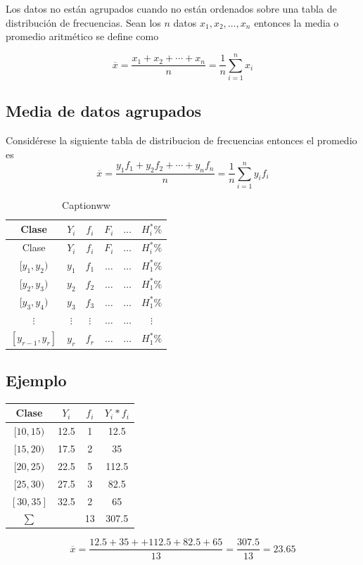 \documentclass[10pt,]{krantz}
\theoremstyle{definition}
\theoremstyle{definition}
\theoremstyle{definition}
\theoremstyle{definition}
\theoremstyle{remark}
\begin{document}
Los datos no están agrupados cuando no están ordenados sobre una tabla de distribución de frecuencias. Sean los \(n\) datos \(x_1, x_2, \ldots, x_n\) entonces la media o promedio aritmético se define como

\[ 
\overline{x}=\frac{x_1+x_2+\cdots+x_n}{n}=\frac{1}{n}\sum_{i=1}^nx_i 
\]

\hypertarget{media-de-datos-agrupados}{%
\subsection{Media de datos agrupados}\label{media-de-datos-agrupados}}

Considérese la siguiente tabla de distribucion de frecuencias entonces el promedio es \[\overline{x}=\frac{y_1f_1+y_2f_2+\cdots+y_nf_n}{n}=\frac{1}{n}\sum_{i=1}^ny_if_i\]

\begin{longtable}[]{@{}cccccc@{}}
\caption{\label{tab:www} Captionww}\tabularnewline
\toprule
Clase & \(Y_i\) & \(f_i\) & \(F_i\) & \(\ldots\) & \(H_i^*\%\)\tabularnewline
\midrule
\endfirsthead
\toprule
Clase & \(Y_i\) & \(f_i\) & \(F_i\) & \(\ldots\) & \(H_i^*\%\)\tabularnewline
\midrule
\endhead
\([y_1,y_2)\) & \(y_1\) & \(f_1\) & \(\ldots\) & \(\ldots\) & \(H_1^*\%\)\tabularnewline
\([y_2,y_3)\) & \(y_2\) & \(f_2\) & \(\ldots\) & \(\ldots\) & \(H_1^*\%\)\tabularnewline
\([y_3,y_4)\) & \(y_3\) & \(f_3\) & \(\ldots\) & \(\ldots\) & \(H_1^*\%\)\tabularnewline
\(\vdots\) & \(\vdots\) & \(\vdots\) & \(\ldots\) & \(\ldots\) & \(\vdots\)\tabularnewline
\([y_{r-1},y_r]\) & \(y_r\) & \(f_r\) & \(\ldots\) & \(\ldots\) & \(H_1^*\%\)\tabularnewline
\bottomrule
\end{longtable}

\hypertarget{ejemplo}{%
\subsection{Ejemplo}\label{ejemplo}}

\begin{longtable}[]{@{}cccc@{}}
\toprule
Clase & \(Y_i\) & \(f_i\) & \(Y_i*f_i\)\tabularnewline
\midrule
\endhead
\([10,15)\) & 12.5 & 1 & 12.5\tabularnewline
\([15,20)\) & 17.5 & 2 & 35\tabularnewline
\([20,25)\) & 22.5 & 5 & 112.5\tabularnewline
\([25,30)\) & 27.5 & 3 & 82.5\tabularnewline
\([30,35]\) & 32.5 & 2 & 65\tabularnewline
\(\sum\) & & 13 & 307.5\tabularnewline
\bottomrule
\end{longtable}

\[\overline{x}=\frac{12.5+35++112.5+82.5+65}{13}=\frac{307.5}{13}=23.65\]
\end{document}
